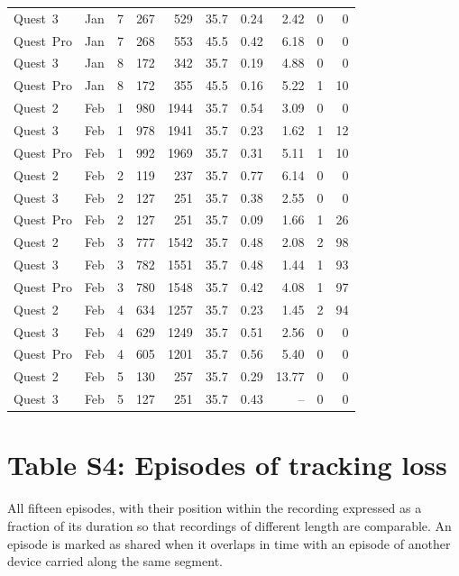 \documentclass[11pt,a4paper]{article}
\begin{document}
{\begin{longtable}{llrrrrrrrr}
Quest~3 & Jan & 7 & 267 & 529 & 35.7 & 0.24 & 2.42 & 0 & 0 \\
Quest~Pro & Jan & 7 & 268 & 553 & 45.5 & 0.42 & 6.18 & 0 & 0 \\
Quest~3 & Jan & 8 & 172 & 342 & 35.7 & 0.19 & 4.88 & 0 & 0 \\
Quest~Pro & Jan & 8 & 172 & 355 & 45.5 & 0.16 & 5.22 & 1 & 10 \\
Quest~2 & Feb & 1 & 980 & 1944 & 35.7 & 0.54 & 3.09 & 0 & 0 \\
Quest~3 & Feb & 1 & 978 & 1941 & 35.7 & 0.23 & 1.62 & 1 & 12 \\
Quest~Pro & Feb & 1 & 992 & 1969 & 35.7 & 0.31 & 5.11 & 1 & 10 \\
Quest~2 & Feb & 2 & 119 & 237 & 35.7 & 0.77 & 6.14 & 0 & 0 \\
Quest~3 & Feb & 2 & 127 & 251 & 35.7 & 0.38 & 2.55 & 0 & 0 \\
Quest~Pro & Feb & 2 & 127 & 251 & 35.7 & 0.09 & 1.66 & 1 & 26 \\
Quest~2 & Feb & 3 & 777 & 1542 & 35.7 & 0.48 & 2.08 & 2 & 98 \\
Quest~3 & Feb & 3 & 782 & 1551 & 35.7 & 0.48 & 1.44 & 1 & 93 \\
Quest~Pro & Feb & 3 & 780 & 1548 & 35.7 & 0.42 & 4.08 & 1 & 97 \\
Quest~2 & Feb & 4 & 634 & 1257 & 35.7 & 0.23 & 1.45 & 2 & 94 \\
Quest~3 & Feb & 4 & 629 & 1249 & 35.7 & 0.51 & 2.56 & 0 & 0 \\
Quest~Pro & Feb & 4 & 605 & 1201 & 35.7 & 0.56 & 5.40 & 0 & 0 \\
Quest~2 & Feb & 5 & 130 & 257 & 35.7 & 0.29 & 13.77 & 0 & 0 \\
Quest~3 & Feb & 5 & 127 & 251 & 35.7 & 0.43 & -- & 0 & 0 \\
\end{longtable}
}

\section*{Table S4: Episodes of tracking loss}

All fifteen episodes, with their position within the recording expressed as a fraction of its duration so that recordings of different length are comparable. An episode is marked as shared when it overlaps in time with an episode of another device carried along the same segment.
\end{document}
